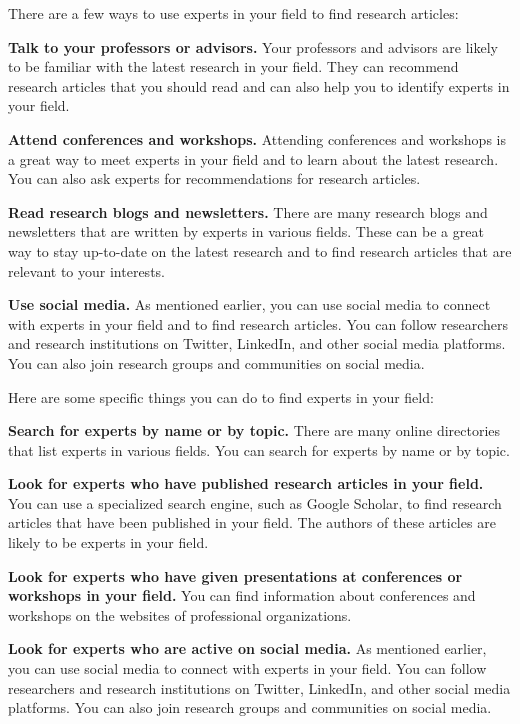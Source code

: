 \documentclass[
]{book}
\begin{document}
There are a few ways to use experts in your field to find research articles:

\textbf{Talk to your professors or advisors.} Your professors and advisors are likely to be familiar with the latest research in your field. They can recommend research articles that you should read and can also help you to identify experts in your field.

\textbf{Attend conferences and workshops.} Attending conferences and workshops is a great way to meet experts in your field and to learn about the latest research. You can also ask experts for recommendations for research articles.

\textbf{Read research blogs and newsletters.} There are many research blogs and newsletters that are written by experts in various fields. These can be a great way to stay up-to-date on the latest research and to find research articles that are relevant to your interests.

\textbf{Use social media.} As mentioned earlier, you can use social media to connect with experts in your field and to find research articles. You can follow researchers and research institutions on Twitter, LinkedIn, and other social media platforms. You can also join research groups and communities on social media.

Here are some specific things you can do to find experts in your field:

\textbf{Search for experts by name or by topic.} There are many online directories that list experts in various fields. You can search for experts by name or by topic.

\textbf{Look for experts who have published research articles in your field.} You can use a specialized search engine, such as Google Scholar, to find research articles that have been published in your field. The authors of these articles are likely to be experts in your field.

\textbf{Look for experts who have given presentations at conferences or workshops in your field.} You can find information about conferences and workshops on the websites of professional organizations.

\textbf{Look for experts who are active on social media.} As mentioned earlier, you can use social media to connect with experts in your field. You can follow researchers and research institutions on Twitter, LinkedIn, and other social media platforms. You can also join research groups and communities on social media.
\end{document}
